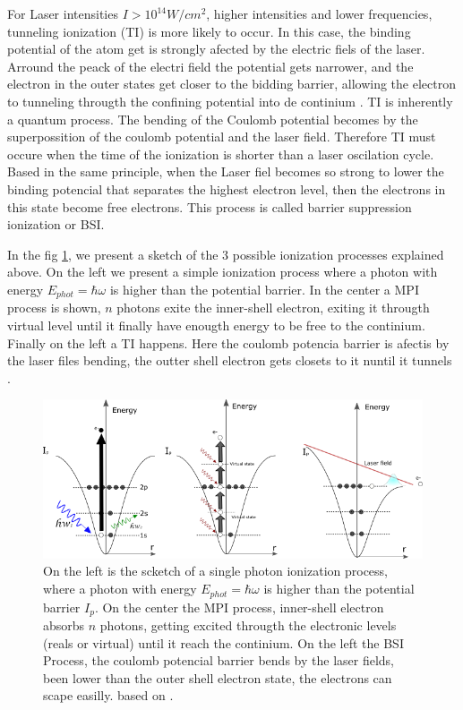 For Laser intensities $I > 10^{14}W/cm^{2}$, higher intensities and lower frequencies, tunneling ionization (TI) is more likely to occur.  In this case, the binding potential of the atom get is strongly afected by the electric fiels of the laser. Arround the peack of the electri field the  potential gets narrower, and the electron in the outer states get closer to the bidding barrier, allowing the electron to tunneling througth the confining potential into de continium  \cite{griffiths_introduction_2013}. TI is inherently a quantum process. The bending of the Coulomb potential becomes by the superpossition of the coulomb potential and the laser field. Therefore TI must occure when the time of the ionization is shorter than a laser oscilation cycle\cite{berkowitz_photoabsorption_1979}. Based in the same principle, when the Laser fiel becomes so strong to lower the binding potencial that separates the highest electron level, then the electrons in this state become free electrons. This process is called barrier suppression ionization or BSI\cite{krishnan_doped_2011}.

In the fig \ref{img:ionizationprocess}, we present a sketch of the 3 possible ionization processes explained above. On the left we present a simple ionization process where a photon with energy $E_{phot} = \hbar\omega$ is higher than the potential barrier. In the center a MPI process is shown, $n$ photons exite the inner-shell electron, exiting it througth virtual level until it finally have enougth energy to be free to the continium. Finally on the left a TI happens. Here the coulomb potencia barrier is afectis by the laser files bending, the outter shell electron  gets closets to it nuntil it tunnels \cite{rafipoor_two-color_2017}.

\begin{figure}[hbtp]
\label{img:ionizationprocess}
\centering
\includegraphics[width = 8 cm]{../Images/photoionization2.png}
\caption[Ionization regimes]{ On the left is the scketch of a single photon ionization process, where a photon with energy $E_{phot} = \hbar\omega$ is higher than the potential barrier $I_{p}$. On the center the MPI process,  inner-shell electron absorbs $n$ photons, getting excited througth the electronic levels (reals or virtual)  until it reach the continium. On the left the BSI Process, the coulomb potencial barrier bends by the laser fields, been lower than the outer shell electron state, the electrons can scape easilly. based on \cite{rafipoor_two-color_2017}.}
\end{figure}


